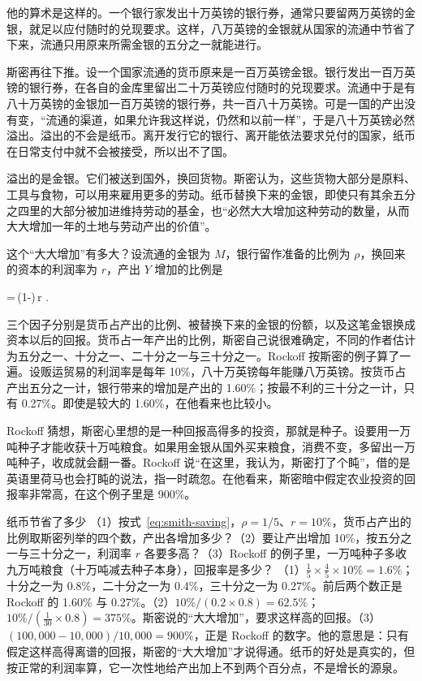 他的算术是这样的。一个银行家发出十万英镑的银行券，通常只要留两万英镑的金银，就足以应付随时的兑现要求。这样，八万英镑的金银就从国家的流通中节省了下来，流通只用原来所需金银的五分之一就能进行\cite{smith1776}。

斯密再往下推。设一个国家流通的货币原来是一百万英镑金银。银行发出一百万英镑的银行券，在各自的金库里留出二十万英镑应付随时的兑现要求。流通中于是有八十万英镑的金银加一百万英镑的银行券，共一百八十万英镑\cite{smith1776}。可是一国的产出没有变，“流通的渠道，如果允许我这样说，仍然和以前一样”，于是八十万英镑必然溢出。溢出的不会是纸币。离开发行它的银行、离开能依法要求兑付的国家，纸币在日常支付中就不会被接受，所以出不了国\cite{smith1776}。

溢出的是金银。它们被送到国外，换回货物。斯密认为，这些货物大部分是原料、工具与食物，可以用来雇用更多的劳动。纸币替换下来的金银，即使只有其余五分之四里的大部分被加进维持劳动的基金，也“必然大大增加这种劳动的数量，从而大大增加一年的土地与劳动产出的价值”\cite{smith1776}。

这个“大大增加”有多大？设流通的金银为 $M$，银行留作准备的比例为 $\rho$，换回来的资本的利润率为 $r$，产出 $Y$ 增加的比例是
\begin{keyeq}
=\,(1-\rho)\,r .\label{eq:smith-saving}
\end{keyeq}
三个因子分别是货币占产出的比例、被替换下来的金银的份额，以及这笔金银换成资本以后的回报。货币占一年产出的比例，斯密自己说很难确定，不同的作者估计为五分之一、十分之一、二十分之一与三十分之一\cite{smith1776}。Rockoff 按斯密的例子算了一遍。设贩运贸易的利润率是每年 10\%，八十万英镑每年能赚八万英镑。按货币占产出五分之一计，银行带来的增加是产出的 1.60\%；按最不利的三十分之一计，只有 0.27\%。即使是较大的 1.60\%，在他看来也比较小\cite{rockoff2009}。

Rockoff 猜想，斯密心里想的是一种回报高得多的投资，那就是种子。设要用一万吨种子才能收获十万吨粮食。如果用金银从国外买来粮食，消费不变，多留出一万吨种子，收成就会翻一番。Rockoff 说“在这里，我认为，斯密打了个盹”，借的是英语里荷马也会打盹的说法，指一时疏忽。在他看来，斯密暗中假定农业投资的回报率非常高，在这个例子里是 900\%\cite{rockoff2009}。

\begin{example}{纸币节省了多少}\label{ex:smith-saving}
（1）按式~\eqref{eq:smith-saving}，$\rho=1/5$、$r=10\%$，货币占产出的比例取斯密列举的四个数，产出各增加多少？（2）要让产出增加 10\%，按五分之一与三十分之一，利润率 $r$ 各要多高？（3）Rockoff 的例子里，一万吨种子多收九万吨粮食（十万吨减去种子本身），回报率是多少？
\solution （1）$\tfrac15\times\tfrac45\times10\%=1.6\%$；十分之一为 0.8\%，二十分之一为 0.4\%，三十分之一为 $0.27\%$。前后两个数正是 Rockoff 的 1.60\% 与 0.27\%。（2）$10\%/(0.2\times0.8)=62.5\%$；$10\%/(\tfrac1{30}\times0.8)=375\%$。斯密说的“大大增加”，要求这样高的回报。（3）$(100{,}000-10{,}000)/10{,}000=900\%$，正是 Rockoff 的数字。他的意思是：只有假定这样高得离谱的回报，斯密的“大大增加”才说得通。纸币的好处是真实的，但按正常的利润率算，它一次性地给产出加上不到两个百分点，不是增长的源泉。
\end{example}

